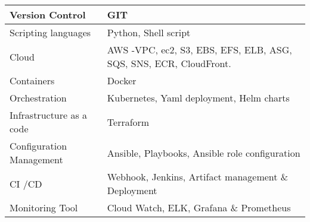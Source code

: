 \documentclass[10pt,a4paper,ragged2e,withhyper]{altacv}
\begin{document}
\begin{paracol}{2}



\switchcolumn
{}

\begin{tabular}{ |p{3cm}||p{3cm}|  }
 \hline
    Version Control &   GIT  \\ \hline
    Scripting languages   & Python, Shell script\\ \hline
    Cloud &   AWS -VPC, ec2, S3, EBS, EFS, ELB, ASG, SQS, SNS, ECR, CloudFront.  \\ \hline
    Containers &   Docker  \\ \hline
    Orchestration &   Kubernetes, Yaml deployment, Helm charts  \\ \hline
    Infrastructure as a code &   Terraform  \\ \hline
    Configuration Management &  Ansible, Playbooks, Ansible role configuration  \\ \hline
    CI \slash CD &  Webhook, Jenkins, Artifact management \& Deployment  \\ \hline
    Monitoring Tool &   Cloud Watch, ELK, Grafana \& Prometheus  \\ \hline


 \hline
\end{tabular}


\switchcolumn
\newpage
{}

\switchcolumn
\newpage
{}


\end{paracol}
\end{document}
